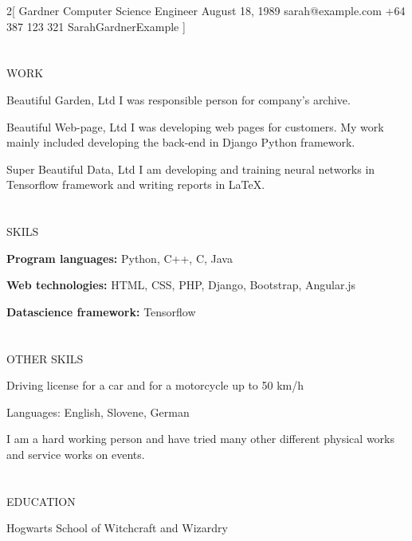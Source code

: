 \documentclass{my_cv}
\begin{document}
\begin{multicols}{2}[
        {Gardner}%
        {Computer Science Engineer}%
        {August 18, 1989}%
        {sarah@example.com}%
        {+64 387 123 321}%
        {SarahGardnerExample}
]

\section{\faPencil}{WORK}

%
    {Beautiful Garden, Ltd}%
    {I was responsible person for company’s archive.}

%
    {Beautiful Web-page, Ltd}%
    {I was developing web pages for customers. My work mainly included developing the back-end in Django Python framework.}
     
%
    {Super Beautiful Data, Ltd}%
    {I am developing and training neural networks in Tensorflow framework and writing reports in LaTeX.}
    
\section{\faFileText}{SKILS}

\textbf{Program languages:} Python, C++, C, Java

\noindent\textbf{Web technologies:} HTML, CSS, PHP,
Django, Bootstrap, Angular.js

\noindent\textbf{Datascience framework:} Tensorflow

\section{\faFileText}{OTHER SKILS}

Driving license for a car and for a motorcycle
up to 50 km/h

\noindent Languages: English, Slovene, German

\noindent I am a hard working person and have tried
many other different physical works and
service works on events.

\columnbreak

\section{\faGraduationCap}{EDUCATION}

%
    {Hogwarts School of Witchcraft and Wizardry}
    

\end{multicols}
\end{document}
